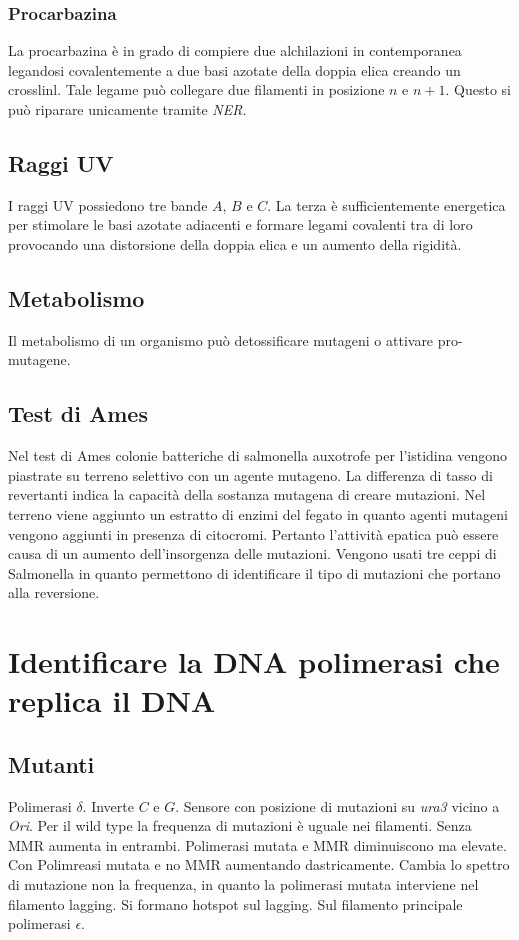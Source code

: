 		\subsubsection{Procarbazina}
		La procarbazina \`e in grado di compiere due alchilazioni in contemporanea legandosi covalentemente a due basi azotate della doppia elica creando un crosslinl.
		Tale legame pu\`o collegare due filamenti in posizione $n$ e $n+1$.
		Questo si pu\`o riparare unicamente tramite \emph{NER}.

	\subsection{Raggi UV}
	I raggi UV possiedono tre bande $A$, $B$ e $C$.
	La terza \`e sufficientemente energetica per stimolare le basi azotate adiacenti e formare legami covalenti tra di loro provocando una distorsione della doppia elica e un aumento della rigidit\`a.
	
	\subsection{Metabolismo}
	Il metabolismo di un organismo pu\`o detossificare mutageni o attivare pro-mutagene.

	\subsection{Test di Ames}
	Nel test di Ames colonie batteriche di salmonella auxotrofe per l'istidina vengono piastrate su terreno selettivo con un agente mutageno.
	La differenza di tasso di revertanti indica la capacit\`a della sostanza mutagena di creare mutazioni.
	Nel terreno viene aggiunto un estratto di enzimi del fegato in quanto agenti mutageni vengono aggiunti in presenza di citocromi.
	Pertanto l'attivit\`a epatica pu\`o essere causa di un aumento dell'insorgenza delle mutazioni.
	Vengono usati tre ceppi di Salmonella in quanto permettono di identificare il tipo di mutazioni che portano alla reversione.

\section{Identificare la DNA polimerasi che replica il DNA}

	\subsection{Mutanti}
	Polimerasi $\delta$. 
	Inverte $C$ e $G$.
	Sensore con posizione di mutazioni su \emph{ura3} vicino a \emph{Ori}.
	Per il wild type la frequenza di mutazioni \`e uguale nei filamenti.
	Senza MMR aumenta in entrambi.
	Polimerasi mutata e MMR diminuiscono ma elevate.
	Con Polimreasi mutata e no MMR aumentando dastricamente.
	Cambia lo spettro di mutazione non la frequenza, in quanto la polimerasi mutata interviene nel filamento lagging.
	Si formano hotspot sul lagging.
	Sul filamento principale polimerasi $\epsilon$.

